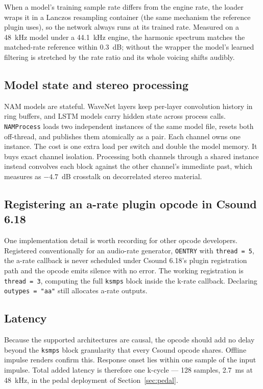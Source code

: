 \documentclass[sigconf,anonymous,review]{nimeart}
\begin{document}
When a model's training sample rate differs from the engine rate, the
loader wraps it in a Lanczos resampling container (the same mechanism the
reference plugin uses), so the network always runs at its trained rate.
Measured on a 48~kHz model under a 44.1~kHz engine, the harmonic spectrum
matches the matched-rate reference within 0.3~dB; without the wrapper the
model's learned filtering is stretched by the rate ratio and its whole
voicing shifts audibly.

\subsection{Model state and stereo processing}
\label{sec:stereo}

NAM models are stateful. WaveNet layers keep per-layer convolution history
in ring buffers, and LSTM models carry hidden state across process calls.
\texttt{NAMProcess} loads two independent instances of the same model
file, resets both off-thread, and publishes them atomically as a pair.
Each channel owns one instance. The cost is one extra load per switch and
double the model memory. It buys exact channel isolation. Processing both
channels through a shared instance instead convolves each block against
the other channel's immediate past, which measures as $-4.7$~dB crosstalk
on decorrelated stereo material.

\subsection{Registering an a-rate plugin opcode in Csound 6.18}
\label{sec:oentry}

One implementation detail is worth recording for other opcode developers.
Registered conventionally for an audio-rate generator, \texttt{OENTRY}
with \texttt{thread = 5}, the a-rate callback is never scheduled under
Csound 6.18's plugin registration path and the opcode emits silence with
no error. The working registration is \texttt{thread = 3}, computing the
full \texttt{ksmps} block inside the k-rate callback. Declaring
\texttt{outypes = "aa"} still allocates a-rate outputs.

\subsection{Latency}
\label{sec:latency}

Because the supported architectures are causal, the opcode should add no
delay beyond the \texttt{ksmps} block granularity that every Csound opcode
shares. Offline impulse renders confirm this. Response onset lies within
one sample of the input impulse. Total added latency is therefore one
k-cycle --- 128 samples, 2.7~ms at 48~kHz, in the pedal deployment of
Section~\ref{sec:pedal}.
\end{document}

